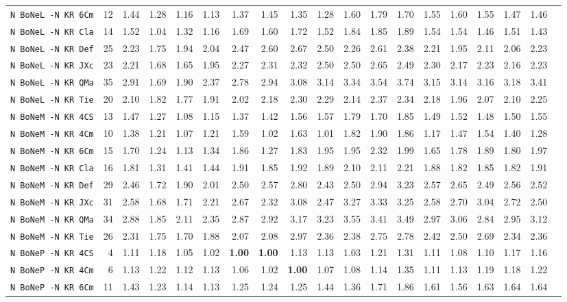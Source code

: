 \begin{tabular}{l | r @{~~} r | r@{~~}r@{~~}r@{~~}r@{~~}r@{~~}r@{~~}r@{~~}r@{~~}r@{~~}r@{~~}r@{~~}r@{~~}r@{~~}r@{~~}r@{~~}r|}
\verb+N BoNeL -N KR 6Cm+ & 12 & 1.44 & 1.28&1.16&1.13&1.37&1.45&1.35&1.28&1.60&1.79&1.70&1.55&1.60&1.55&1.47&1.46\\
\verb+N BoNeL -N KR Cla+ & 14 & 1.52 & 1.04&1.32&1.16&1.69&1.60&1.72&1.52&1.84&1.85&1.89&1.54&1.54&1.46&1.51&1.43\\
\verb+N BoNeL -N KR Def+ & 25 & 2.23 & 1.75&1.94&2.04&2.47&2.60&2.67&2.50&2.26&2.61&2.38&2.21&1.95&2.11&2.06&2.23\\
\verb+N BoNeL -N KR JXc+ & 23 & 2.21 & 1.68&1.65&1.95&2.27&2.31&2.32&2.50&2.50&2.65&2.49&2.30&2.17&2.23&2.16&2.23\\
\verb+N BoNeL -N KR QMa+ & 35 & 2.91 & 1.69&1.90&2.37&2.78&2.94&3.08&3.14&3.34&3.54&3.74&3.15&3.14&3.16&3.18&3.41\\
\verb+N BoNeL -N KR Tie+ & 20 & 2.10 & 1.82&1.77&1.91&2.02&2.18&2.30&2.29&2.14&2.37&2.34&2.18&1.96&2.07&2.10&2.25\\
\verb+N BoNeM -N KR 4CS+ & 13 & 1.47 & 1.27&1.08&1.15&1.37&1.42&1.56&1.57&1.79&1.70&1.85&1.49&1.52&1.48&1.50&1.55\\
\verb+N BoNeM -N KR 4Cm+ & 10 & 1.38 & 1.21&1.07&1.21&1.59&1.02&1.63&1.01&1.82&1.90&1.86&1.17&1.47&1.54&1.40&1.28\\
\verb+N BoNeM -N KR 6Cm+ & 15 & 1.70 & 1.24&1.13&1.34&1.86&1.27&1.83&1.95&1.95&2.32&1.99&1.65&1.78&1.89&1.80&1.97\\
\verb+N BoNeM -N KR Cla+ & 16 & 1.81 & 1.31&1.41&1.44&1.91&1.85&1.92&1.89&2.10&2.11&2.21&1.88&1.82&1.85&1.82&1.91\\
\verb+N BoNeM -N KR Def+ & 29 & 2.46 & 1.72&1.90&2.01&2.50&2.57&2.80&2.43&2.50&2.94&3.23&2.57&2.65&2.49&2.56&2.52\\
\verb+N BoNeM -N KR JXc+ & 31 & 2.58 & 1.68&1.71&2.21&2.67&2.32&3.08&2.47&3.27&3.33&3.25&2.58&2.70&3.04&2.72&2.50\\
\verb+N BoNeM -N KR QMa+ & 34 & 2.88 & 1.85&2.11&2.35&2.87&2.92&3.17&3.23&3.55&3.41&3.49&2.97&3.06&2.84&2.95&3.12\\
\verb+N BoNeM -N KR Tie+ & 26 & 2.31 & 1.75&1.70&1.88&2.07&2.08&2.97&2.36&2.38&2.75&2.78&2.42&2.50&2.69&2.34&2.36\\
\verb+N BoNeP -N KR 4CS+ & 4 & 1.11 & 1.18&1.05&1.02&\textbf{1.00}&\textbf{1.00}&1.13&1.13&1.03&1.21&1.31&1.11&1.08&1.10&1.17&1.16\\
\verb+N BoNeP -N KR 4Cm+ & 6 & 1.13 & 1.22&1.12&1.13&1.06&1.02&\textbf{1.00}&1.07&1.08&1.14&1.35&1.11&1.13&1.19&1.18&1.22\\
\verb+N BoNeP -N KR 6Cm+ & 11 & 1.43 & 1.23&1.14&1.13&1.25&1.24&1.25&1.44&1.36&1.71&1.86&1.61&1.56&1.63&1.64&1.64\\

\end{tabular}
